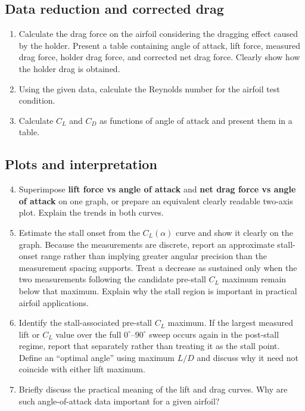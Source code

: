 \documentclass[12pt,letterpaper]{article}
\begin{document}
\subsection*{Data reduction and corrected drag}
\begin{enumerate}[leftmargin=*, label=\arabic*.]
    \item Calculate the drag force on the airfoil considering the dragging effect caused by the holder. Present a table containing angle of attack, lift force, measured drag force, holder drag force, and corrected net drag force. Clearly show how the holder drag is obtained.
    \item Using the given data, calculate the Reynolds number for the airfoil test condition.
    \item Calculate \(C_L\) and \(C_D\) as functions of angle of attack and present them in a table.
\end{enumerate}

\subsection*{Plots and interpretation}
\begin{enumerate}[leftmargin=*, label=\arabic*.]
    \setcounter{enumi}{3}
    \item Superimpose \textbf{lift force vs angle of attack} and \textbf{net drag force vs angle of attack} on one graph, or prepare an equivalent clearly readable two-axis plot. Explain the trends in both curves.
    \item Estimate the stall onset from the \(C_L(\alpha)\) curve and show it clearly on the graph. Because the measurements are discrete, report an approximate stall-onset range rather than implying greater angular precision than the measurement spacing supports. Treat a decrease as sustained only when the two measurements following the candidate pre-stall \(C_L\) maximum remain below that maximum. Explain why the stall region is important in practical airfoil applications.
    \item Identify the stall-associated pre-stall \(C_L\) maximum. If the largest measured lift or \(C_L\) value over the full \(0^\circ\)--\(90^\circ\) sweep occurs again in the post-stall regime, report that separately rather than treating it as the stall point. Define an ``optimal angle'' using maximum \(L/D\) and discuss why it need not coincide with either lift maximum.
    \item Briefly discuss the practical meaning of the lift and drag curves. Why are such angle-of-attack data important for a given airfoil?
\end{enumerate}
\end{document}
